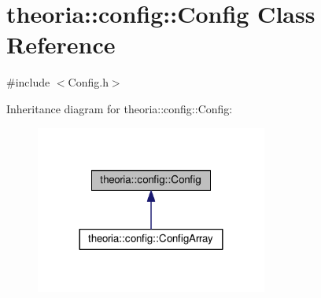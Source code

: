 \hypertarget{classtheoria_1_1config_1_1Config}{}\section{theoria\+:\+:config\+:\+:Config Class Reference}
\label{classtheoria_1_1config_1_1Config}


{\ttfamily \#include $<$Config.\+h$>$}



Inheritance diagram for theoria\+:\+:config\+:\+:Config\+:\nopagebreak
\begin{figure}[H]
\begin{center}
\leavevmode
\includegraphics[width=216pt]{classtheoria_1_1config_1_1Config__inherit__graph}
\end{center}
\end{figure}


